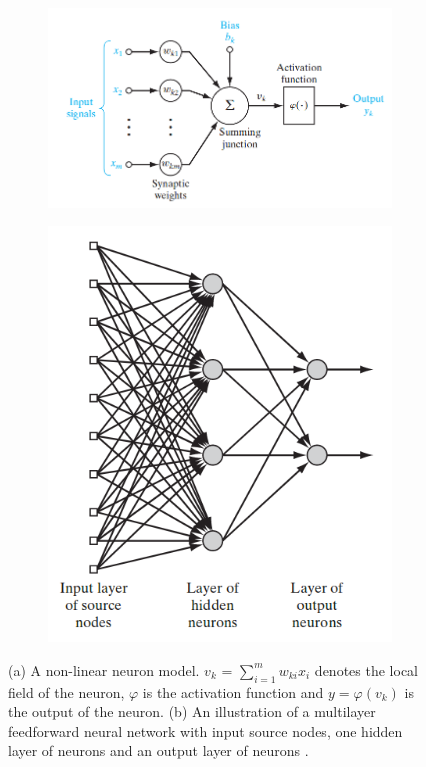 	\begin{figure}
		\centering
		\begin{subfigure}{.5\textwidth}
			\centering
			\includegraphics[width=1\linewidth]{images/neuron}
			\caption{}
			\label{Fig:haykin_ann_n}
		\end{subfigure}
		\begin{subfigure}{.3\textwidth}
			\centering
			\includegraphics[width=1\linewidth]{images/ml_ff_nn}
			\caption{}
			\label{Fig:haykin_ann_ml}
		\end{subfigure}
		\caption{(a) A non-linear neuron model. $v_k$ = $\sum_{i=1}^{m} w_{ki} x_i$ denotes the local field of the neuron, $\varphi$ is the activation function and $y = \varphi(v_k)$ is the output of the neuron. (b) An illustration of a multilayer feedforward neural network with input source nodes, one hidden layer of neurons and an output layer of neurons \cite{haykin}.}
		\label{Fig:haykin_ann}
	\end{figure}
	
